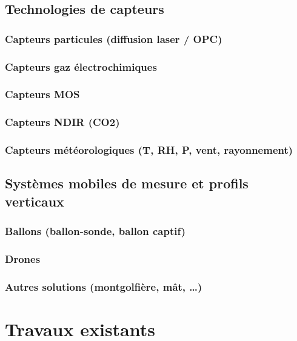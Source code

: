 \subsection{Technologies de capteurs}
\subsubsection{Capteurs particules (diffusion laser / OPC)}
\subsubsection{Capteurs gaz électrochimiques}
\subsubsection{Capteurs MOS}
\subsubsection{Capteurs NDIR (CO2)}
\subsubsection{Capteurs météorologiques (T, RH, P, vent, rayonnement)}

\subsection{Systèmes mobiles de mesure et profils verticaux}
\subsubsection{Ballons (ballon-sonde, ballon captif)}
\subsubsection{Drones}
\subsubsection{Autres solutions (montgolfière, mât, \dots)}

\section{Travaux existants}


